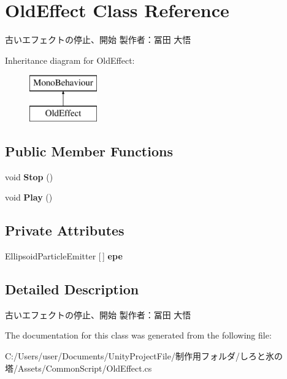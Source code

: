 \hypertarget{class_old_effect}{}\section{Old\+Effect Class Reference}
\label{class_old_effect}


古いエフェクトの停止、開始 製作者：冨田 大悟  


Inheritance diagram for Old\+Effect\+:\begin{figure}[H]
\begin{center}
\leavevmode
\includegraphics[height=2.000000cm]{class_old_effect}
\end{center}
\end{figure}
\subsection*{Public Member Functions}
\begin{DoxyCompactItemize}
\item 
\mbox{\label{class_old_effect_aab23ff92c34f9a90e92e95a9cc030307}} 
void {\bfseries Stop} ()
\item 
\mbox{\label{class_old_effect_aca54d0185006f938b55b700bcd44c1ce}} 
void {\bfseries Play} ()
\end{DoxyCompactItemize}
\subsection*{Private Attributes}
\begin{DoxyCompactItemize}
\item 
\mbox{\label{class_old_effect_a3ef1e515712d7a28a39c9e4ed26b5317}} 
Ellipsoid\+Particle\+Emitter \mbox{[}$\,$\mbox{]} {\bfseries epe}
\end{DoxyCompactItemize}


\subsection{Detailed Description}
古いエフェクトの停止、開始 製作者：冨田 大悟 



The documentation for this class was generated from the following file\+:\begin{DoxyCompactItemize}
\item 
C\+:/\+Users/user/\+Documents/\+Unity\+Project\+File/制作用フォルダ/しろと氷の塔/\+Assets/\+Common\+Script/Old\+Effect.\+cs\end{DoxyCompactItemize}
